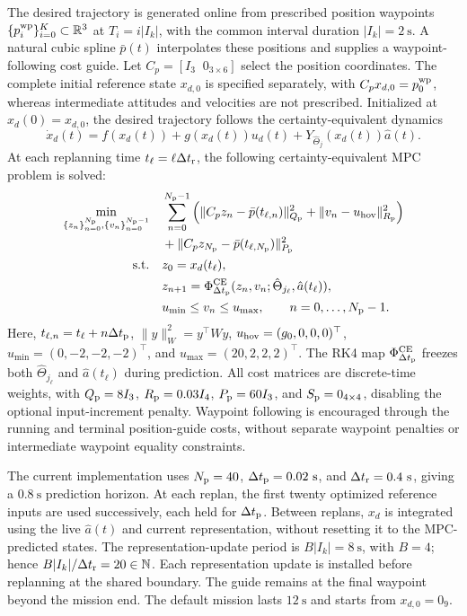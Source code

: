 \documentclass[11pt]{article}
\begin{document}
The desired trajectory is generated online from prescribed position
waypoints $\{p_i^{\rm wp}\}_{i=0}^{K}\subset\mathbb R^3$ at
$T_i=i|I_k|$, with the common interval duration $|I_k|=2~\mathrm s$.
A natural cubic spline $\bar p(t)$ interpolates these positions and
supplies a waypoint-following cost guide. Let
$C_p=[I_3\;\;0_{3\times6}]$ select the position coordinates.
The complete initial reference state $x_{d,0}$ is specified separately,
with $C_px_{d,0}=p_0^{\rm wp}$, whereas intermediate attitudes and
velocities are not prescribed. Initialized at $x_d(0)=x_{d,0}$, the
desired trajectory follows the certainty-equivalent dynamics
\begin{equation}\label{eq:quad-reference}
    \dot x_d(t)=f(x_d(t))+g(x_d(t))u_d(t)
        +Y_{\hat\Theta_j}(x_d(t))\hat a(t).
\end{equation}
At each replanning time $t_\ell=\ell\Delta t_{\rm r}$, the following
certainty-equivalent MPC problem is solved:
\begin{equation}\label{eq:quad-mpc}
\begin{aligned}
    \min_{\{z_n\}_{n=0}^{N_{\rm p}},\{v_n\}_{n=0}^{N_{\rm p}-1}}\quad&
    \sum_{n=0}^{N_{\rm p}-1}\left(
        \|C_pz_n-\bar p(t_{\ell,n})\|_{Q_{\rm p}}^2
        +\|v_n-u_{\rm hov}\|_{R_{\rm p}}^2\right)\\
    &+\|C_pz_{N_{\rm p}}-\bar p(t_{\ell,N_{\rm p}})\|_{P_{\rm p}}^2\\
    \text{s.t.}\quad&z_0=x_d(t_\ell),\\
    &z_{n+1}=\Phi_{\Delta t_{\rm p}}^{\rm CE}
      (z_n,v_n;\hat\Theta_{j_\ell},\hat a(t_\ell)),\\
    &u_{\min}\le v_n\le u_{\max},\qquad n=0,\ldots,N_{\rm p}-1.
\end{aligned}
\end{equation}
Here, $t_{\ell,n}=t_\ell+n\Delta t_{\rm p}$,
$\|y\|_W^2=y^\top Wy$, $u_{\rm hov}=(g_0,0,0,0)^\top$,
$u_{\min}=(0,-2,-2,-2)^\top$, and
$u_{\max}=(20,2,2,2)^\top$. The RK4 map
$\Phi_{\Delta t_{\rm p}}^{\rm CE}$ freezes both
$\hat\Theta_{j_\ell}$ and $\hat a(t_\ell)$ during prediction.
All cost matrices are discrete-time weights, with
$Q_{\rm p}=8I_3$, $R_{\rm p}=0.03I_4$, $P_{\rm p}=60I_3$, and
$S_{\rm p}=0_{4\times4}$, disabling the optional input-increment penalty.
Waypoint following is encouraged through the running and terminal
position-guide costs, without separate waypoint penalties or intermediate
waypoint equality constraints.

The current implementation uses $N_{\rm p}=40$,
$\Delta t_{\rm p}=0.02~\mathrm s$, and
$\Delta t_{\rm r}=0.4~\mathrm s$, giving a $0.8~\mathrm s$ prediction
horizon. At each replan, the first twenty optimized reference inputs
are used successively, each held for $\Delta t_{\rm p}$.
Between replans, $x_d$ is integrated using the live $\hat a(t)$ and
current representation, without resetting it to the MPC-predicted states.
The representation-update period is $B|I_k|=8~\mathrm s$, with $B=4$;
hence $B|I_k|/\Delta t_{\rm r}=20\in\mathbb N$.
Each representation update is installed before replanning at the shared
boundary. The guide remains at the final waypoint beyond the mission end.
The default mission lasts $12~\mathrm s$ and starts from $x_{d,0}=0_9$.
\end{document}
